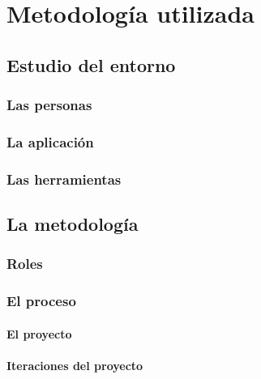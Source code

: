 \documentclass{iccmemoria}
\begin{document}
\chapter{Metodología utilizada}


	\section{Estudio del entorno}
	

		\subsection{Las personas}
		

		\subsection{La aplicación}
		

		\subsection{Las herramientas}
		
	
	\section{La metodología}
	
		\subsection{Roles}
		

		\subsection{El proceso}
		

			\subsubsection{El proyecto}
			

			\subsubsection{Iteraciones del proyecto}
			\label{sec:Iteracion}
			
\end{document}
